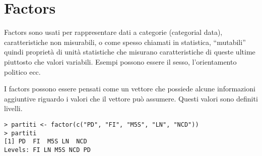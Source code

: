 \section{Factors}

Factors sono usati per rappresentare dati a categorie (categorial data), caratteristiche non misurabili, o come spesso chiamati in statistica, ``mutabili'' quindi proprietà di unità statistiche che misurano caratteristiche di queste ultime piuttosto che valori variabili. Esempi possono essere il sesso, l'orientamento politico ecc.

I factors possono essere pensati come un vettore che possiede alcune informazioni aggiuntive riguardo i valori che il vettore può assumere. Questi valori sono definiti livelli.

\begin{lstlisting}
> partiti <- factor(c("PD", "FI", "M5S", "LN", "NCD"))
> partiti
[1] PD  FI  M5S LN  NCD
Levels: FI LN M5S NCD PD
\end{lstlisting}
